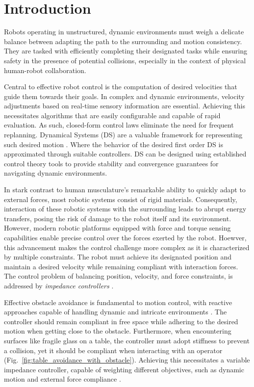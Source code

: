\section{Introduction}
Robots operating in unstructured, dynamic environments must weigh a delicate balance between adapting the path to the surrounding and motion consistency. They are tasked with efficiently completing their designated tasks while ensuring safety in the presence of potential collisions, especially in the context of physical human-robot collaboration.

Central to effective robot control is the computation of desired velocities that guide them towards their goals. In complex and dynamic environments, velocity adjustments based on real-time sensory information are essential. Achieving this necessitates algorithms that are easily configurable and capable of rapid evaluation. As such, closed-form control laws eliminate the need for frequent replanning. Dynamical Systems (DS) are a valuable framework for representing such desired motion \cite{huber2019avoidance}. Where the behavior of the desired first order DS is approximated through suitable controllers. DS can be designed using established control theory tools to provide stability and convergence guarantees for navigating dynamic environments.

In stark contrast to human musculature's remarkable ability to quickly adapt to external forces, most robotic systems consist of rigid materials. Consequently, interaction of these robotic systems with the surrounding leads to abrupt energy transfers, posing the risk of damage to the robot itself and its environment. However, modern robotic platforms equipped with force and torque sensing capabilities enable precise control over the forces exerted by the robot.
Hoewver, this advancement makes the control challenge more complex as it is characterized by multiple constraints. The robot must achieve its designated position and maintain a desired velocity while remaining compliant with interaction forces. The control problem of balancing position, velocity, and force constraints, is addressed by \textit{impedance controllers} \iflong
\parencite{takegaki1981new, hogan1984impedance} \else \parencite{hogan1985impedance}\fi.

Effective obstacle avoidance is fundamental to motion control, with reactive approaches capable of handling dynamic and intricate environments \parencite{huber2019avoidance}. The controller should remain compliant in free space while adhering to the desired motion when getting close to the obstacle. Furthermore, when encountering surfaces like fragile glass on a table, the controller must adopt stiffness to prevent a collision, yet it should be compliant when interacting with an operator (Fig.~\ref{fig:table_avoidance_with_obstacle}). Achieving this necessitates a variable impedance controller, capable of weighting different objectives, such as dynamic motion and external force compliance \parencite{kronander2015passive}.

